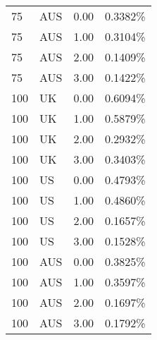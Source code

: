 \begin{table}[ht]
\begin{tabular}{llrl}
  75 & AUS & 0.00 & 0.3382\% \\ 
  75 & AUS & 1.00 & 0.3104\% \\ 
  75 & AUS & 2.00 & 0.1409\% \\ 
  75 & AUS & 3.00 & 0.1422\% \\ 
  100 & UK & 0.00 & 0.6094\% \\ 
  100 & UK & 1.00 & 0.5879\% \\ 
  100 & UK & 2.00 & 0.2932\% \\ 
  100 & UK & 3.00 & 0.3403\% \\ 
  100 & US & 0.00 & 0.4793\% \\ 
  100 & US & 1.00 & 0.4860\% \\ 
  100 & US & 2.00 & 0.1657\% \\ 
  100 & US & 3.00 & 0.1528\% \\ 
  100 & AUS & 0.00 & 0.3825\% \\ 
  100 & AUS & 1.00 & 0.3597\% \\ 
  100 & AUS & 2.00 & 0.1697\% \\ 
  100 & AUS & 3.00 & 0.1792\% \\ 
   \hline
\end{tabular}
\end{table}
